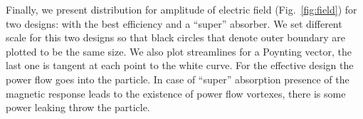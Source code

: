 \documentclass[aps,prl,twocolumn,showpacs,superscriptaddress,groupedaddress]{revtex4-1}
\begin{document}
\begin{figure}
\end{figure}
Finally, we present distribution for amplitude of electric field
(Fig.~\ref{fig:field}) for two designs: with the best efficiency and a
``super'' absorber.  We set different scale for this two designs so
that black circles that denote outer boundary are plotted to be the
same size.  We also plot streamlines for a Poynting vector, the last
one is tangent at each point to the white curve.  For the effective
design the power flow goes into the particle.  In case of ``super''
absorption presence of the magnetic response leads to the existence of
power flow vortexes, there is some power leaking throw the particle.









\end{document}
